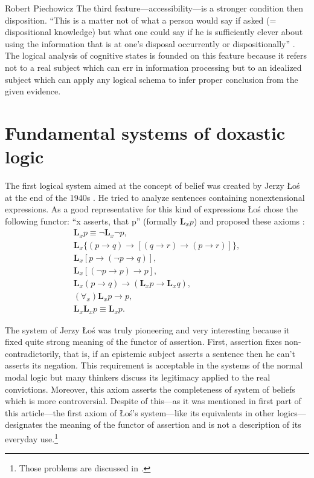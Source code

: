 \begin{artengenv}{Robert Piechowicz}
The third feature---accessibility---is a stronger condition then disposition. ``This is a matter not of what a person would say if asked (= dispositional knowledge) but what one could say if he is sufficiently clever about using the information that is at one’s disposal occurrently or dispositionally''
\parencite[][p.478]{jacquette_epistemic_2002}.
The logical analysis of cognitive states is founded on this feature because it refers not to a real subject which can err in information processing but to an idealized subject which can apply any logical schema to infer proper conclusion from the given evidence.
	
\section{Fundamental systems of doxastic logic}

\indent The first logical system aimed at the concept of belief was created by Jerzy \L{}o\'{s} at the end of the 1940s
\parencite{los_logiki_1948}.
He tried to analyze sentences containing nonextensional expressions. As a good representative for this kind of expressions \L{}o\'{s} chose the following functor: ``x asserts, that p'' (formally $\mathbf{L}_{x}p$) and proposed these axioms
\parencite[see][p.251]{lechniak_przekonania_2011}:
\begin{gather}
	\mathbf{L}_{x}p\equiv \neg \mathbf{L}_{x}\neg p,\tag*{1.} \\
	\mathbf{L}_{x}\{(p\rightarrow q)\rightarrow [(q\rightarrow r)\rightarrow (p\rightarrow r)]\},\tag*{2.}\\
	\mathbf{L}_{x}[p\rightarrow (\neg p\rightarrow q)],\tag*{3.}\\
	\mathbf{L}_{x}[(\neg p\rightarrow p)\rightarrow p],\tag*{4.}\\
	\mathbf{L}_{x}(p\rightarrow q)\rightarrow (\mathbf{L}_{x}p\rightarrow \mathbf{L}_{x}q),\tag*{5.}\\
	(\forall_{x})\mathbf{L}_{x}p\rightarrow  p,\tag*{6.}\\
	\mathbf{L}_{x}\mathbf{L}_{x} p\equiv\mathbf{ L}_{x}p.\tag*{7.}
\end{gather}

The system of Jerzy \L{}o\'{s} was truly pioneering and very interesting because it fixed quite strong meaning of the functor of assertion. First, assertion fixes non-contradictorily, that is, if an epistemic subject asserts a sentence then he can’t asserts its negation. This requirement is acceptable in the systems of the normal modal logic but many thinkers discuss its legitimacy applied to the real convictions. Moreover, this axiom asserts the completeness of system of beliefs which is more controversial. Despite of this---as it was mentioned in first part of this article---the first axiom of \L{}o\'{s}’s system---like its equivalents in other logics---designates the meaning of the functor of assertion and is not a description of its everyday use.\footnote{Those problems are discussed in
\parencites[][pp.80-82, 93-94]{marciszewski_podstawy_1972}{poczobut_sprzecznosci_1999}.}


\end{artengenv}
